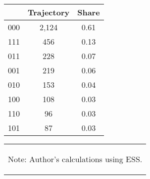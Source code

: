 \begin{table}
\centering
\caption{Frequencies of Trajectories of Households}
\label{tbl:Trajectories}
\begin{tabular}{lcc}
\toprule
{} &  Trajectory & Share \\
\midrule
000 &        2,124 &  0.61  \\
111 &         456 &  0.13  \\
011 &         228 &  0.07  \\
001 &         219 &  0.06  \\
010 &         153 &  0.04  \\
100 &         108 &  0.03  \\
110 &          96 &  0.03  \\
101 &          87 &  0.03  \\
\bottomrule
\end{tabular}
\begin{table}[H]
    \centering
    \begin{tabular}{p{}} 
        \begin{tablenotes}
              \tiny
              \item Note: Author's calculations using ESS.
        \end{tablenotes}
    \end{tabular}
\end{table}    
\end{table}








